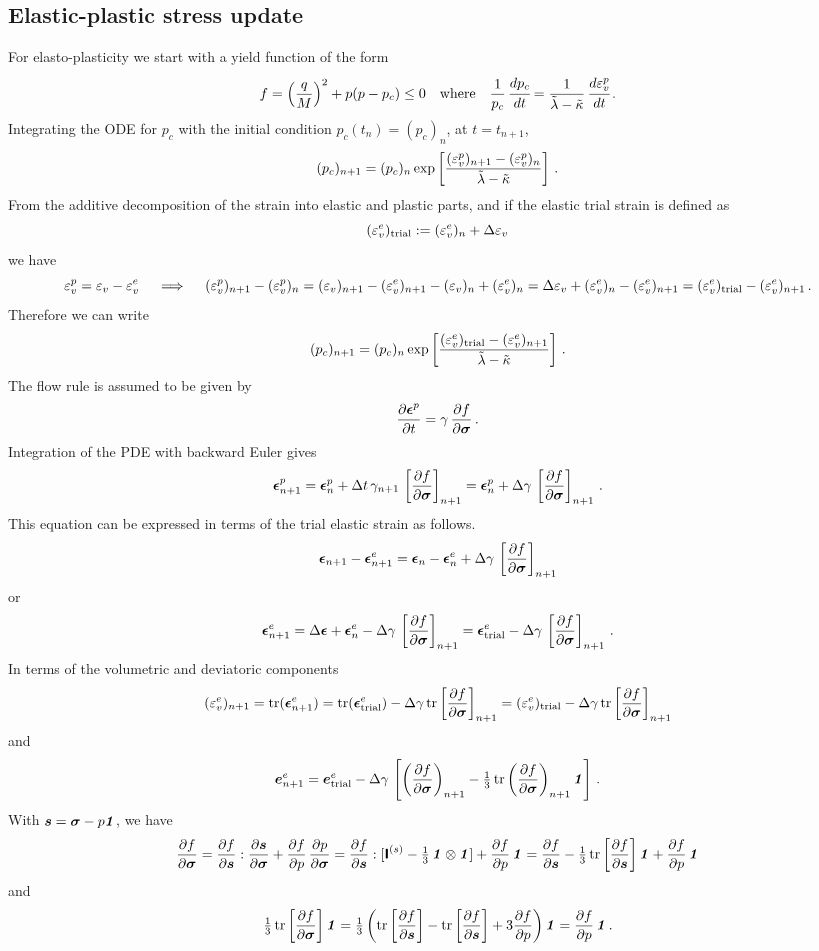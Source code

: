 \subsection{Elastic-plastic stress update}
For elasto-plasticity we start with a yield function of the form
\[
   f = \left(\frac{q}{M}\right)^2 + p(p-p_c) \le 0 
   \quad \text{where} \quad
  \frac{1}{p_c}\,\Deriv{p_c}{t} = \frac{1}{\lambdatilde- \kappatilde}\,\Deriv{\Ve_v^p}{t} \,.
\]
Integrating the ODE for $p_c$ with the initial condition $p_c(t_n) = (p_c)_n$, at $t = t_{n+1}$, 
\[
   (p_c)_{n+1} = (p_c)_n \exp\left[\frac{(\Ve_v^p)_{n+1} - (\Ve_v^p)_n}{\lambdatilde - \kappatilde}\right] \,.
\]
From the additive decomposition of the strain into elastic and plastic parts, and if the elastic trial 
strain is defined as 
\[
   (\Ve_v^e)_\Trial := (\Ve_v^e)_n + \Delta\Ve_v
\]
we have
\[
   \Ve_v^p = \Ve_v - \Ve_v^e \quad \implies \quad
   (\Ve_v^p)_{n+1} - (\Ve_v^p)_n = (\Ve_v)_{n+1} - (\Ve_v^e)_{n+1} - (\Ve_v)_{n} + (\Ve_v^e)_{n} 
                               = \Delta\Ve_v + (\Ve_v^e)_{n} - (\Ve_v^e)_{n+1} 
                               = (\Ve_v^e)_\Trial - (\Ve_v^e)_{n+1} \,.
\]
Therefore we can write
\[
   (p_c)_{n+1} = (p_c)_n \exp\left[\frac{(\Ve_v^e)_\Trial - (\Ve_v^e)_{n+1}}{\lambdatilde - \kappatilde}\right] \,.
\]
The flow rule is assumed to be given by
\[
   \Partial{\Beps^p}{t} = \gamma\,\Partial{f}{\Bsig} \,.
\]
Integration of the PDE with backward Euler gives
\[
  \Beps^p_{n+1} = \Beps^p_n + \Delta t\,\gamma_{n+1}\,\left[\Partial{f}{\Bsig}\right]_{n+1} 
             = \Beps^p_n + \Delta\gamma\,\left[\Partial{f}{\Bsig}\right]_{n+1} \,.
\]
This equation can be expressed in terms of the trial elastic strain as follows.
\[
  \Beps_{n+1}-\Beps^e_{n+1} = \Beps_n - \Beps^e_n + \Delta\gamma\,\left[\Partial{f}{\Bsig}\right]_{n+1} 
\]
or
\[
  \Beps^e_{n+1} = \Delta\Beps + \Beps^e_n - \Delta\gamma\,\left[\Partial{f}{\Bsig}\right]_{n+1} 
             = \Beps^e_\Trial - \Delta\gamma\,\left[\Partial{f}{\Bsig}\right]_{n+1} \,.
\]
In terms of the volumetric and deviatoric components
\[
  (\Ve_v^e)_{n+1} = \Tr(\Beps^e_{n+1}) = \Tr(\Beps^e_\Trial) - \Delta\gamma\,\Tr\left[\Partial{f}{\Bsig}\right]_{n+1} = (\Ve_v^e)_\Trial - \Delta\gamma\,\Tr\left[\Partial{f}{\Bsig}\right]_{n+1} 
\]
and
\[
  \BeT^e_{n+1} = \BeT^e_\Trial - \Delta\gamma\,\left[\left(\Partial{f}{\Bsig}\right)_{n+1}
      - \tfrac{1}{3}\,\Tr\left(\Partial{f}{\Bsig}\right)_{n+1}\Bone\right] \,.
\]
With $\BsT = \Bsig - p\Bone$, we have
\[
  \Partial{f}{\Bsig} = \Partial{f}{\BsT}:\Partial{\BsT}{\Bsig} + \Partial{f}{p}\,\Partial{p}{\Bsig}
    = \Partial{f}{\BsT}:[\SfI^{(s)} - \tfrac{1}{3}\,\Bone\otimes\Bone] 
      + \Partial{f}{p}\,\Bone
    = \Partial{f}{\BsT} - \tfrac{1}{3}\,\Tr\left[\Partial{f}{\BsT}\right]\Bone
      + \Partial{f}{p}\,\Bone
\]
and
\[
  \tfrac{1}{3}\,\Tr\left[\Partial{f}{\Bsig}\right]\Bone = 
    \tfrac{1}{3}\left(\Tr\left[\Partial{f}{\BsT}\right] - \Tr\left[\Partial{f}{\BsT}\right]
      + 3\Partial{f}{p}\right)\Bone  =  \Partial{f}{p}\,\Bone \,.
\]

